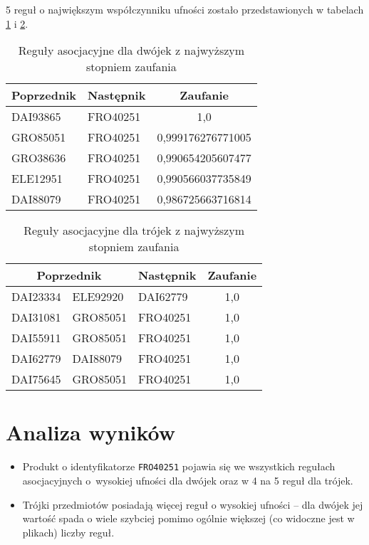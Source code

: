 \documentclass[a4paper,11pt]{article}
\begin{document}
    5 reguł o największym współczynniku ufności zostało przedstawionych w tabelach \ref{tab:dubs} i \ref{tab:trips}.

    \begin{table}[H]
        \centering
        \caption{Reguły asocjacyjne dla dwójek z najwyższym stopniem zaufania}
        \label{tab:dubs}
        \begin{tabular}{@{}llc@{}}
            \toprule
            \multicolumn{1}{c}{Poprzednik} & \multicolumn{1}{c}{Następnik} & Zaufanie          \\ \midrule
            DAI93865   & FRO40251  & 1,0               \\
            GRO85051   & FRO40251  & 0,999176276771005 \\
            GRO38636   & FRO40251  & 0,990654205607477 \\
            ELE12951   & FRO40251  & 0,990566037735849 \\
            DAI88079   & FRO40251  & 0,986725663716814 \\ \bottomrule
        \end{tabular}
    \end{table}

    \begin{table}[H]
        \centering
        \caption{Reguły asocjacyjne dla trójek z najwyższym stopniem zaufania}
        \label{tab:trips}
        \begin{tabular}{@{}lllc@{}}
            \toprule
            \multicolumn{2}{c}{Poprzednik} & \multicolumn{1}{c}{Następnik} & Zaufanie   \\ \midrule
            DAI23334       & ELE92920      & DAI62779  & 1,0        \\ 
            DAI31081       & GRO85051      & FRO40251  & 1,0        \\ 
            DAI55911       & GRO85051      & FRO40251  & 1,0        \\ 
            DAI62779       & DAI88079      & FRO40251  & 1,0        \\ 
            DAI75645       & GRO85051      & FRO40251  & 1,0        \\ \bottomrule
        \end{tabular}
    \end{table}

\section{Analiza wyników}
    \begin{itemize}
        \item Produkt o identyfikatorze \texttt{FRO40251} pojawia się we wszystkich regułach asocjacyjnych o~wysokiej ufności dla dwójek oraz w 4 na 5 reguł dla trójek.
        \item Trójki przedmiotów posiadają więcej reguł o wysokiej ufności -- dla dwójek jej wartość spada o wiele szybciej pomimo ogólnie większej (co widoczne jest w plikach) liczby reguł.
    \end{itemize}
\end{document}
